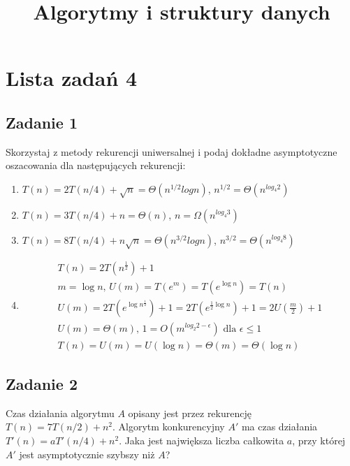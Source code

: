 \documentclass{article}
\begin{document}
\title{Algorytmy i struktury danych}
\author{}
\date{}
\maketitle

\section*{Lista zadań 4}

\subsection*{Zadanie 1}
Skorzystaj z metody rekurencji uniwersalnej i podaj dokładne asymptotyczne
oszacowania dla następujących rekurencji:
\begin{enumerate}[label=(\alph*)]
    \item $T(n) = 2T(n/4) + \sqrt{n} = \Theta(n^{1/2}logn)$, $n^{1/2} = \Theta(n^{log_4 2})$
    \item $T(n) = 3T(n/4) + n = \Theta(n)$, $n = \Omega(n^{log_4 3})$
    \item $T(n) = 8T(n/4) + n\sqrt{n} = \Theta(n^{3/2}logn)$, $n^{3/2} = \Theta(n^{log_4 8})$
    \item \begin{gather*}
              T(n) = 2T\left(n^\frac{1}{2}\right) + 1 \\
              m = \log n \text{, } U(m) = T\left(e^m\right) = T\left(e^{\log n}\right) = T(n) \\
              U(m) = 2T\left(e^{\log n^\frac{1}{2}}\right) + 1 = 2T\left(e^{\frac{1}{2}\log n}\right) + 1 = 2U\left(\frac{m}{2}\right) + 1 \\
              U(m) = \Theta(m) \text{, } 1 = O\left(m^{log_2 2-\epsilon}\right) \text{ dla } \epsilon \leq 1 \\
              T(n) = U(m) = U(\log n) = \Theta(m) = \Theta(\log n)
          \end{gather*}
\end{enumerate}

\subsection*{Zadanie 2}
Czas działania algorytmu $A$ opisany jest przez rekurencję $T(n) = 7T(n/2) + n^2$.
Algorytm konkurencyjny $A'$ ma czas działania $T '(n) = aT'(n/4) + n^2$. Jaka jest największa
liczba całkowita $a$, przy której $A'$ jest asymptotycznie szybszy niż $A$?
\end{document}
